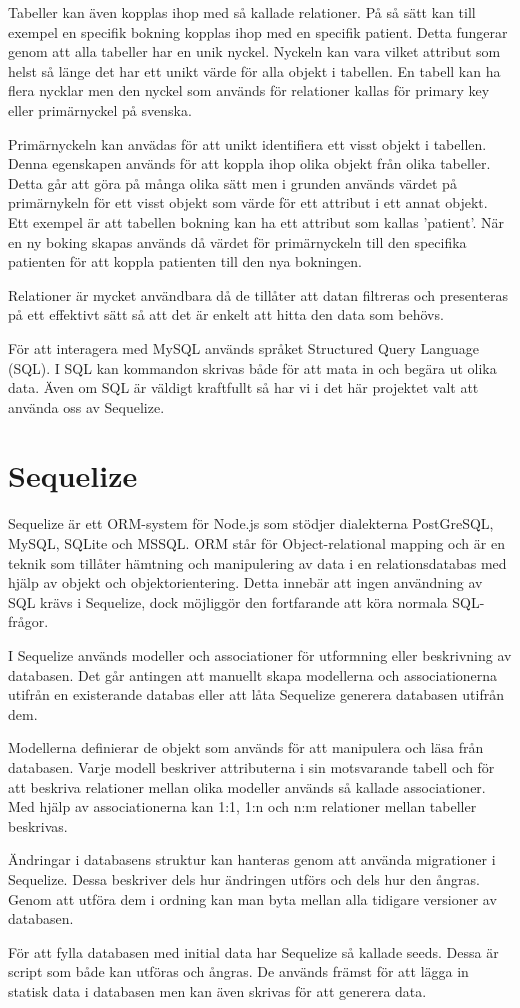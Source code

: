 Tabeller kan även kopplas ihop med så kallade relationer. På så sätt kan till exempel en specifik bokning kopplas ihop med en specifik patient. Detta fungerar genom att alla tabeller har en unik nyckel. Nyckeln kan vara vilket attribut som helst så länge det har ett unikt värde för alla objekt i tabellen. En tabell kan ha flera nycklar men den nyckel som används för relationer kallas för primary key eller primärnyckel på svenska. 

Primärnyckeln kan anvädas för att unikt identifiera ett visst objekt i tabellen. Denna egenskapen används för att koppla ihop olika objekt från olika tabeller. Detta går att göra på många olika sätt men i grunden används värdet på primärnykeln för ett visst objekt som värde för ett attribut i ett annat objekt. Ett exempel är att tabellen bokning kan ha ett attribut som kallas 'patient'. När en ny boking skapas används då värdet för primärnyckeln till den specifika patienten för att koppla patienten till den nya bokningen.

Relationer är mycket användbara då de tillåter att datan filtreras och presenteras på ett effektivt sätt så att det är enkelt att hitta den data som behövs.

För att interagera med MySQL används språket Structured Query Language (SQL). I SQL kan kommandon skrivas både för att mata in och begära ut olika data. Även om SQL är väldigt kraftfullt så har vi i det här projektet valt att använda oss av Sequelize.


\section{Sequelize}
Sequelize är ett ORM-system för Node.js som stödjer dialekterna PostGreSQL, MySQL, SQLite och MSSQL. \cite{sequelize} ORM står för Object-relational mapping och är en teknik som tillåter hämtning och manipulering av data i en relationsdatabas med hjälp av objekt och objektorientering. Detta innebär att ingen användning av SQL krävs i Sequelize, dock möjliggör den fortfarande att köra normala SQL-frågor.

I Sequelize används modeller och associationer för utformning eller beskrivning av databasen. Det går antingen att manuellt skapa modellerna och associationerna utifrån en existerande databas eller att låta Sequelize generera databasen utifrån dem.

Modellerna definierar de objekt som används för att manipulera och läsa från databasen. Varje modell beskriver attributerna i sin motsvarande tabell och för att beskriva relationer mellan olika modeller används så kallade associationer. Med hjälp av associationerna kan 1:1, 1:n och n:m relationer mellan tabeller beskrivas.

Ändringar i databasens struktur kan hanteras genom att använda migrationer i Sequelize. Dessa beskriver dels hur ändringen utförs och dels hur den ångras. Genom att utföra dem i ordning kan man byta mellan alla tidigare versioner av databasen. \cite{migrations}

För att fylla databasen med initial data har Sequelize så kallade seeds. Dessa är script som både kan utföras och ångras. De används främst för att lägga in statisk data i databasen men kan även skrivas för att generera data.
